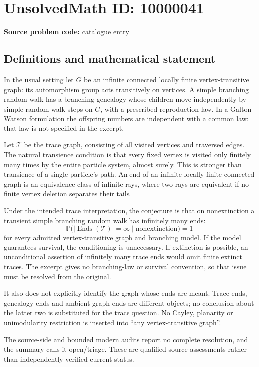 \documentclass[11pt]{article}
\begin{document}
\section*{UnsolvedMath ID: 10000041}
\textbf{Source problem code:} catalogue entry
\subsection{Definitions and mathematical statement}
In the usual setting let \(G\) be an infinite connected locally finite vertex-transitive graph: its automorphism group acts transitively on vertices. A simple branching random walk has a branching genealogy whose children move independently by simple random-walk steps on \(G\), with a prescribed reproduction law. In a Galton--Watson formulation the offspring numbers are independent with a common law; that law is not specified in the excerpt.

Let \(\mathcal T\) be the trace graph, consisting of all visited vertices and traversed edges. The natural transience condition is that every fixed vertex is visited only finitely many times by the entire particle system, almost surely. This is stronger than transience of a single particle's path. An end of an infinite locally finite connected graph is an equivalence class of infinite rays, where two rays are equivalent if no finite vertex deletion separates their tails.

Under the intended trace interpretation, the conjecture is that on nonextinction a transient simple branching random walk has infinitely many ends:
\[
 \mathbb P\bigl(|\operatorname{Ends}(\mathcal T)|=\infty\mid\text{nonextinction}\bigr)=1
\]
for every admitted vertex-transitive graph and branching model. If the model guarantees survival, the conditioning is unnecessary. If extinction is possible, an unconditional assertion of infinitely many trace ends would omit finite extinct traces. The excerpt gives no branching-law or survival convention, so that issue must be resolved from the original.

It also does not explicitly identify the graph whose ends are meant. Trace ends, genealogy ends and ambient-graph ends are different objects; no conclusion about the latter two is substituted for the trace question. No Cayley, planarity or unimodularity restriction is inserted into ``any vertex-transitive graph''.

The source-side and bounded modern audits report no complete resolution, and the summary calls it open/triage. These are qualified source assessments rather than independently verified current status.
\end{document}
